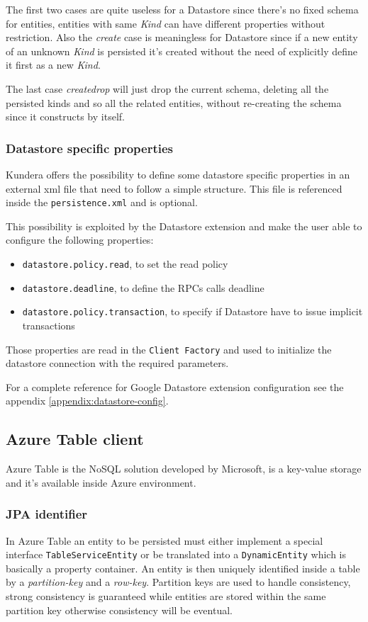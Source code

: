 \noindent The first two cases are quite useless for a Datastore since there's no fixed schema for entities, entities with same \textit{Kind} can have different properties without restriction.
Also the \textit{create} case is meaningless for Datastore since if a new entity of an unknown \textit{Kind} is persisted it's created without the need of explicitly define it first as a new \textit{Kind}.

\noindent The last case \textit{create\textunderscore drop} will just drop the current schema, deleting all the persisted kinds and so all the related entities, without re-creating the schema since it constructs by itself.

\subsubsection{Datastore specific properties}
Kundera offers the possibility to define some datastore specific properties in an external xml file that need to follow a simple structure. This file is referenced inside the \texttt{persistence.xml} and is optional.

\newparagraph This possibility is exploited by the Datastore extension and make the user able to configure the following properties:
\begin{itemize}
\item \texttt{datastore.policy.read}, to set the read policy
\item \texttt{datastore.deadline}, to define the RPCs calls deadline
\item \texttt{datastore.policy.transaction}, to specify if Datastore have to issue implicit transactions
\end{itemize}
Those properties are read in the \texttt{Client Factory} and used to initialize the datastore connection with the required parameters.

\newparagraph For a complete reference for Google Datastore extension configuration see the appendix \ref{appendix:datastore-config}.

\subsection{Azure Table client}
\label{sec:kundera-table}
Azure Table \cite{online:azuretable} is the NoSQL solution developed by Microsoft, is a key-value storage and it's available inside Azure environment.

\subsubsection{JPA identifier}
In Azure Table an entity to be persisted must either implement a special interface \texttt{TableServiceEntity} or be translated into a \texttt{DynamicEntity} which is basically a property container.
An entity is then uniquely identified inside a table by a \textit{partition-key} and a \textit{row-key}.
\noindent Partition keys are used to handle consistency, strong consistency is guaranteed while entities are stored within the same partition key otherwise consistency will be eventual.

